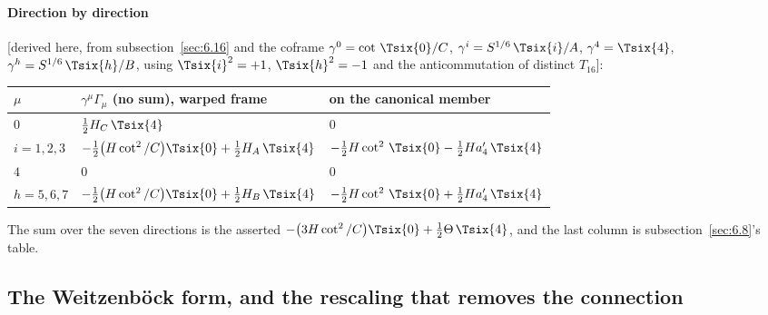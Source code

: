 \paragraph{Direction by direction} [derived here, from subsection~\ref{sec:6.16} and the coframe
$\gamma^0=\cot\,\Tsix{0}/C$, $\gamma^i=S^{1/6}\,\Tsix{i}/A$, $\gamma^4=\Tsix{4}$,
$\gamma^h=S^{1/6}\,\Tsix{h}/B$, using $\Tsix{i}^2=+1$, $\Tsix{h}^2=-1$ and the anticommutation of distinct
$T_{16}$]:
\begin{center}
\renewcommand{\arraystretch}{1.35}
\begin{tabular}{@{}lll@{}}
\toprule
$\mu$ & $\gamma^\mu\Gamma_\mu$ (no sum), warped frame & on the canonical member\\
\midrule
$0$ & $\tfrac12H_C\,\Tsix{4}$ & $0$\\
$i=1,2,3$ & $-\tfrac12\bigl(H\cot^2/C\bigr)\Tsix{0}+\tfrac12H_A\,\Tsix{4}$ & $-\tfrac12H\cot^2\,\Tsix{0}-\tfrac12Ha_4'\,\Tsix{4}$\\
$4$ & $0$ & $0$\\
$h=5,6,7$ & $-\tfrac12\bigl(H\cot^2/C\bigr)\Tsix{0}+\tfrac12H_B\,\Tsix{4}$ & $-\tfrac12H\cot^2\,\Tsix{0}+\tfrac12Ha_4'\,\Tsix{4}$\\
\bottomrule
\end{tabular}
\end{center}
The sum over the seven directions is the asserted $-\bigl(3H\cot^2/C\bigr)\Tsix{0}+\tfrac12\Theta\,\Tsix{4}$,
and the last column is subsection~\ref{sec:6.8}'s table.

\subsection{The Weitzenb\"ock form, and the rescaling that removes the connection}
\label{sec:6.18}

